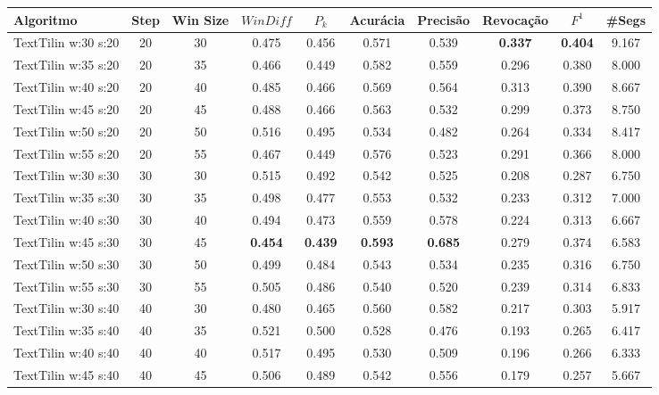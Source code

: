 \documentclass{article}
\begin{document}
 

\begin{longtable}[c]{|l|c|c|c|c|c|c|c|c|c|} 
\hline 
Algoritmo & Step & Win Size & $WinDiff$ & $P_k$ & Acurácia & Precisão & Revocação & $F^1$ & \#Segs\\ \hline 
TextTilin w:30 s:20 & 20 & 30 & 0.475 & 0.456 & 0.571 & 0.539 & \cellcolor{gray!20} \textbf{0.337} & \cellcolor{gray!20} \textbf{0.404} & 9.167  \\ \hline 
 TextTilin w:35 s:20 & 20 & 35 & 0.466 & 0.449 & 0.582 & 0.559 & 0.296 & 0.380 & 8.000  \\ \hline 
 TextTilin w:40 s:20 & 20 & 40 & 0.485 & 0.466 & 0.569 & 0.564 & 0.313 & 0.390 & 8.667  \\ \hline 
 TextTilin w:45 s:20 & 20 & 45 & 0.488 & 0.466 & 0.563 & 0.532 & 0.299 & 0.373 & 8.750  \\ \hline 
 TextTilin w:50 s:20 & 20 & 50 & 0.516 & 0.495 & 0.534 & 0.482 & 0.264 & 0.334 & 8.417  \\ \hline 
 TextTilin w:55 s:20 & 20 & 55 & 0.467 & 0.449 & 0.576 & 0.523 & 0.291 & 0.366 & 8.000  \\ \hline 
 TextTilin w:30 s:30 & 30 & 30 & 0.515 & 0.492 & 0.542 & 0.525 & 0.208 & 0.287 & 6.750  \\ \hline 
 TextTilin w:35 s:30 & 30 & 35 & 0.498 & 0.477 & 0.553 & 0.532 & 0.233 & 0.312 & 7.000  \\ \hline 
 TextTilin w:40 s:30 & 30 & 40 & 0.494 & 0.473 & 0.559 & 0.578 & 0.224 & 0.313 & 6.667  \\ \hline 
 TextTilin w:45 s:30 & 30 & 45 & \cellcolor{gray!20} \textbf{0.454} & \cellcolor{gray!20} \textbf{0.439} & \cellcolor{gray!20} \textbf{0.593} & \cellcolor{gray!20} \textbf{0.685} & 0.279 & 0.374 & 6.583  \\ \hline 
 TextTilin w:50 s:30 & 30 & 50 & 0.499 & 0.484 & 0.543 & 0.534 & 0.235 & 0.316 & 6.750  \\ \hline 
 TextTilin w:55 s:30 & 30 & 55 & 0.505 & 0.486 & 0.540 & 0.520 & 0.239 & 0.314 & 6.833  \\ \hline 
 TextTilin w:30 s:40 & 40 & 30 & 0.480 & 0.465 & 0.560 & 0.582 & 0.217 & 0.303 & 5.917  \\ \hline 
 TextTilin w:35 s:40 & 40 & 35 & 0.521 & 0.500 & 0.528 & 0.476 & 0.193 & 0.265 & 6.417  \\ \hline 
 TextTilin w:40 s:40 & 40 & 40 & 0.517 & 0.495 & 0.530 & 0.509 & 0.196 & 0.266 & 6.333  \\ \hline 
 TextTilin w:45 s:40 & 40 & 45 & 0.506 & 0.489 & 0.542 & 0.556 & 0.179 & 0.257 & 5.667  \\ \hline 

\end{longtable}
\end{document}
